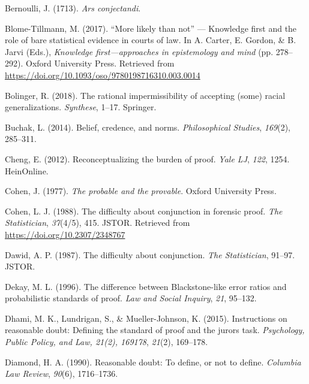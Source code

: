 \documentclass[10pt,dvipsnames,enabledeprecatedfontcommands]{scrartcl}
\begin{document}
\leavevmode\hypertarget{ref-Bernoulli1713Ars-conjectandi}{}%
Bernoulli, J. (1713). \emph{Ars conjectandi}.

\leavevmode\hypertarget{ref-BlomeTillmann2017}{}%
Blome-Tillmann, M. (2017). ``More likely than not'' --- Knowledge first
and the role of bare statistical evidence in courts of law. In A.
Carter, E. Gordon, \& B. Jarvi (Eds.), \emph{Knowledge
first---approaches in epistemology and mind} (pp. 278--292). Oxford
University Press. Retrieved from
\url{https://doi.org/10.1093/oso/9780198716310.003.0014}

\leavevmode\hypertarget{ref-bolinger2018rational}{}%
Bolinger, R. (2018). The rational impermissibility of accepting (some)
racial generalizations. \emph{Synthese}, 1--17. Springer.

\leavevmode\hypertarget{ref-buchak2014belief}{}%
Buchak, L. (2014). Belief, credence, and norms. \emph{Philosophical
Studies}, \emph{169}(2), 285--311.

\leavevmode\hypertarget{ref-cheng2012reconceptualizing}{}%
Cheng, E. (2012). Reconceptualizing the burden of proof. \emph{Yale LJ},
\emph{122}, 1254. HeinOnline.

\leavevmode\hypertarget{ref-Cohen1977The-probable-an}{}%
Cohen, J. (1977). \emph{The probable and the provable}. Oxford
University Press.

\leavevmode\hypertarget{ref-cohen1988difficulty}{}%
Cohen, L. J. (1988). The difficulty about conjunction in forensic proof.
\emph{The Statistician}, \emph{37}(4/5), 415. JSTOR. Retrieved from
\url{https://doi.org/10.2307/2348767}

\leavevmode\hypertarget{ref-dawid1987difficulty}{}%
Dawid, A. P. (1987). The difficulty about conjunction. \emph{The
Statistician}, 91--97. JSTOR.

\leavevmode\hypertarget{ref-Dekay1996}{}%
Dekay, M. L. (1996). The difference between Blackstone-like error ratios
and probabilistic standards of proof. \emph{Law and Social Inquiry},
\emph{21}, 95--132.

\leavevmode\hypertarget{ref-dhamiEtAl2015}{}%
Dhami, M. K., Lundrigan, S., \& Mueller-Johnson, K. (2015). Instructions
on reasonable doubt: Defining the standard of proof and the jurors task.
\emph{Psychology, Public Policy, and Law, 21(2), 169178}, \emph{21}(2),
169--178.

\leavevmode\hypertarget{ref-diamond90}{}%
Diamond, H. A. (1990). Reasonable doubt: To define, or not to define.
\emph{Columbia Law Review}, \emph{90}(6), 1716--1736.
\end{document}
